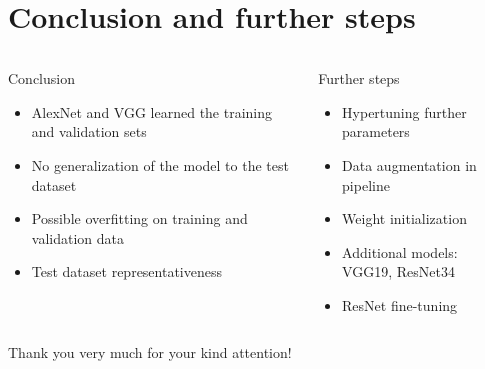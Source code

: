 \documentclass[aspectratio=169]{beamer}
\begin{document}
\section{Conclusion and further steps}
\begin{frame}{}
    \begin{columns}[T]
        \begin{block}{Conclusion}
            \begin{itemize}
                \item AlexNet and VGG learned the training and validation sets
                \item No generalization of the model to the test dataset
                \item Possible overfitting on training and validation data
                \item Test dataset representativeness
            \end{itemize}
        \end{block}
        \pause
        \begin{block}{Further steps}
            \begin{itemize}
                \item Hypertuning further parameters
                \item Data augmentation in pipeline
                \item Weight initialization
                \item Additional models: VGG19, ResNet34
                \item ResNet fine-tuning
            \end{itemize}
        \end{block}
    \end{columns}
\end{frame}

\begin{frame}
    \centering \Large
    Thank you very much for your kind attention!
\end{frame}
\end{document}
